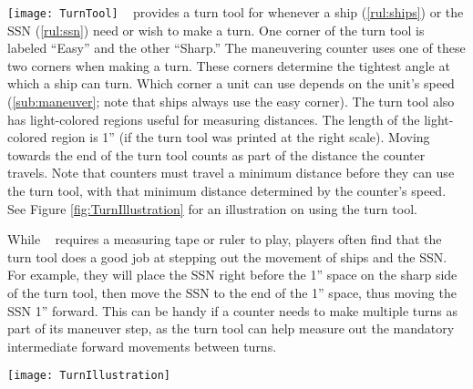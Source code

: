 \documentclass[../TacSubMicroRules.tex]{subfiles}
\begin{document}
\texttt{[image: TurnTool]}
\gametitle~ provides a turn tool for whenever a ship (\ref{rul:ships}) or the SSN (\ref{rul:ssn}) need or wish to make a turn.
One corner of the turn tool is labeled ``Easy'' and the other ``Sharp.''
The maneuvering counter uses one of these two corners when making a turn.
These corners determine the tightest angle at which a ship can turn.
Which corner a unit can use depends on the unit's speed (\ref{sub:maneuver}; note that ships always use the easy corner).
The turn tool also has light-colored regions useful for measuring distances.
The length of the light-colored region is 1'' (if the turn tool was printed at the right scale).
Moving towards the end of the turn tool counts as part of the distance the counter travels.
Note that counters must travel a minimum distance before they can use the turn tool, with that minimum distance determined by the counter's speed.
See Figure \ref{fig:TurnIllustration} for an illustration on using the turn tool.

\begin{design}
    While \gametitle~ requires a measuring tape or ruler to play, players often find that the turn tool does a good job at stepping out the movement of ships and the SSN.
    For example, they will place the SSN right before the 1'' space on the sharp side of the turn tool, then move the SSN to the end of the 1'' space, thus moving the SSN 1'' forward.
    This can be handy if a counter needs to make multiple turns as part of its maneuver step, as the turn tool can help measure out the mandatory intermediate forward movements between turns.
\end{design}

\begin{Figure}
    \centering
    \texttt{[image: TurnIllustration]}
    \label{fig:TurnIllustration}
\end{Figure}
\end{document}
